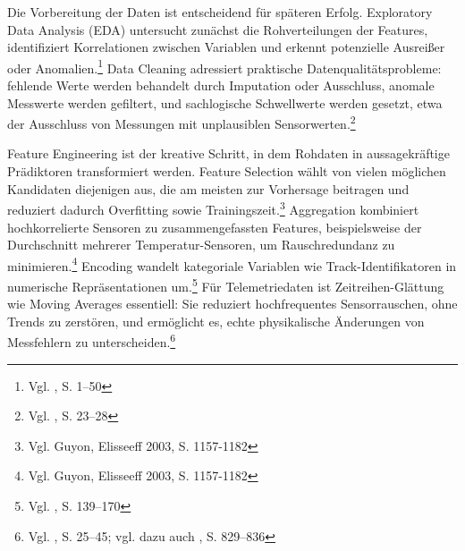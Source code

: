 Die Vorbereitung der Daten ist entscheidend für späteren Erfolg. Exploratory Data Analysis (EDA) untersucht zunächst die Rohverteilungen der Features, identifiziert Korrelationen zwischen Variablen und erkennt potenzielle Ausreißer oder Anomalien.\footnote{Vgl. \cite{Tukey1977}, S. 1–50} Data Cleaning adressiert praktische Datenqualitätsprobleme: fehlende Werte werden behandelt durch Imputation oder Ausschluss, anomale Messwerte werden gefiltert, und sachlogische Schwellwerte werden gesetzt, etwa der Ausschluss von Messungen mit unplausiblen Sensorwerten.\footnote{Vgl. \cite{Chapman2000}, S. 23–28}

Feature Engineering ist der kreative Schritt, in dem Rohdaten in aussagekräftige Prädiktoren transformiert werden. Feature Selection wählt von vielen möglichen Kandidaten diejenigen aus, die am meisten zur Vorhersage beitragen und reduziert dadurch Overfitting sowie Trainingszeit.\footnote{Vgl. Guyon, Elisseeff 2003, S. 1157-1182} Aggregation kombiniert hochkorrelierte Sensoren zu zusammengefassten Features, beispielsweise der Durchschnitt mehrerer Temperatur-Sensoren, um Rauschredundanz zu minimieren.\footnote{Vgl. Guyon, Elisseeff 2003, S. 1157-1182} Encoding wandelt kategoriale Variablen wie Track-Identifikatoren in numerische Repräsentationen um.\footnote{Vgl. \cite{Kuhn2019}, S. 139–170} Für Telemetriedaten ist Zeitreihen-Glättung wie Moving Averages essentiell: Sie reduziert hochfrequentes Sensorrauschen, ohne Trends zu zerstören, und ermöglicht es, echte physikalische Änderungen von Messfehlern zu unterscheiden.\footnote{Vgl. \cite{Box2015}, S. 25–45; vgl. dazu auch \cite{Cleveland1979}, S. 829–836}


